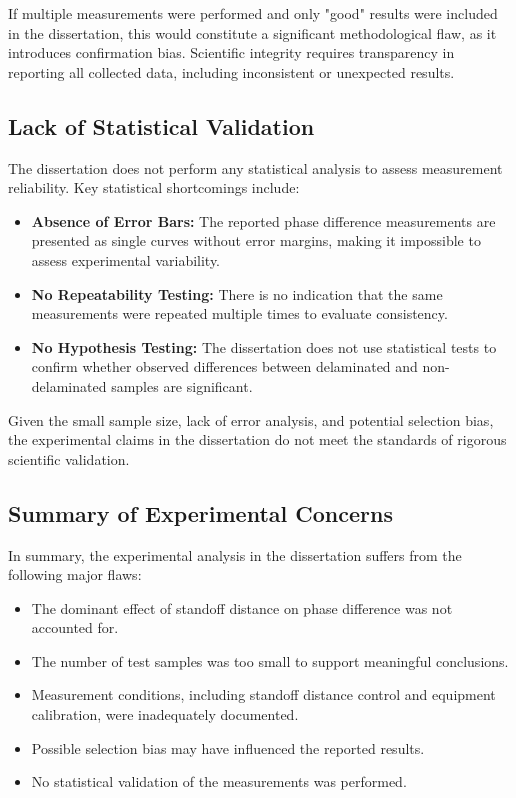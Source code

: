 \documentclass[10pt,twocolumn]{article}
\begin{document}
If multiple measurements were performed and only "good" results were included in the dissertation, this would constitute a significant methodological flaw, as it introduces confirmation bias. Scientific integrity requires transparency in reporting all collected data, including inconsistent or unexpected results.

\subsection{Lack of Statistical Validation}

The dissertation does not perform any statistical analysis to assess measurement reliability. Key statistical shortcomings include:

\begin{itemize}
    \item \textbf{Absence of Error Bars:} The reported phase difference measurements are presented as single curves without error margins, making it impossible to assess experimental variability.
    \item \textbf{No Repeatability Testing:} There is no indication that the same measurements were repeated multiple times to evaluate consistency.
    \item \textbf{No Hypothesis Testing:} The dissertation does not use statistical tests to confirm whether observed differences between delaminated and non-delaminated samples are significant.
\end{itemize}

Given the small sample size, lack of error analysis, and potential selection bias, the experimental claims in the dissertation do not meet the standards of rigorous scientific validation.

\subsection{Summary of Experimental Concerns}

In summary, the experimental analysis in the dissertation suffers from the following major flaws:

\begin{itemize}
    \item The dominant effect of standoff distance on phase difference was not accounted for.
    \item The number of test samples was too small to support meaningful conclusions.
    \item Measurement conditions, including standoff distance control and equipment calibration, were inadequately documented.
    \item Possible selection bias may have influenced the reported results.
    \item No statistical validation of the measurements was performed.
\end{itemize}
\end{document}
